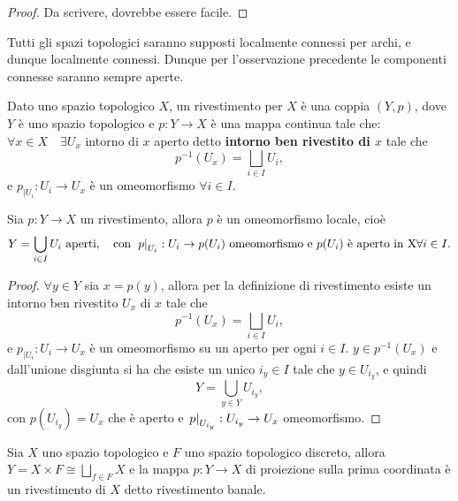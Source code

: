 \documentclass[]{article}
\begin{document}
\begin{proof}
    Da scrivere, dovrebbe essere facile. \nl
\end{proof}

Tutti gli spazi topologici saranno supposti localmente connessi per archi, e dunque localmente connessi. \nl
Dunque per l'osservazione precedente le componenti connesse saranno sempre aperte.

\begin{definition} [Rivestimento] \nl
    Dato uno spazio topologico $X$, un rivestimento per $X$ \`e una coppia $\left(Y, p\right)$, dove
    $Y$ \`e uno spazio topologico e $p: Y \to X$ \`e una mappa continua tale che: \nl
    $\forall x \in X \quad \exists U_x$ intorno di $x$ aperto detto \textbf{intorno ben rivestito di $x$} tale che 
    \[p^{-1}(U_x) = \bigsqcup_{i \in I} U_i,\]
    e $p_{\big| U_i}: U_i \to U_x$ \`e un omeomorfismo $\forall i \in I$. \nl
\end{definition}

\begin{proposition}  \nl
    Sia $p: Y \to X$ un rivestimento, allora $p$ \`e un omeomorfismo locale, cio\`e
    \[
        Y = \bigcup_{i \in I} U_i \text{ aperti}, \quad \text{con } \left. p \right|_{U_i}: U_i \to p(U_i) \text{ omeomorfismo e } p(U_i) \text{ \`e aperto in X} \forall i \in I.
    \]
\end{proposition}

\begin{proof} \nl
    $\forall y \in Y$ sia $x = p(y)$, allora per la definizione di rivestimento esiste un intorno ben rivestito $U_x$ di $x$ tale che
    \[
        p^{-1}(U_x) = \bigsqcup_{i \in I} U_i,
    \]
    e $p_{\big| U_i}: U_i \to U_x$ \`e un omeomorfismo su un aperto per ogni $i \in I$. \nl 
    $y \in p^{-1}(U_x)$ e dall'unione disgiunta si ha che esiste un unico $i_{y} \in I$ tale che $y \in U_{i_y}$, e quindi
    \[
        Y = \bigcup_{y \in Y} U_{i_y},
    \]
    con $p(U_{i_y}) = U_x$ che \`e aperto e $\left. p \right|_{U_{i_y}}: U_{i_y} \to U_x$ omeomorfismo. \nl
\end{proof}

\begin{example}  \nl
    Sia $X$ uno spazio topologico e $F$ uno spazio topologico discreto, allora $Y = X \times F \cong \bigsqcup_{f \in F} X$ e la mappa $p: Y \to X$ di proiezione sulla prima coordinata
    \`e un rivestimento di $X$ detto rivestimento banale.
\end{example}
\end{document}
